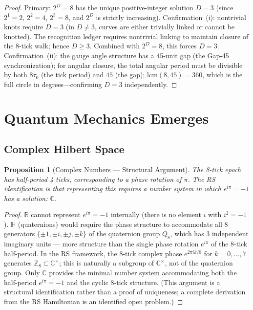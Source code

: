 \documentclass[12pt,a4paper]{article}
\newtheorem{proposition}[theorem]{Proposition}
\theoremstyle{definition}
\theoremstyle{remark}
\begin{document}
\begin{proof}
Primary: $2^D = 8$ has the unique positive-integer solution $D = 3$
(since $2^1 = 2$, $2^2 = 4$, $2^3 = 8$, and $2^D$ is strictly
increasing).
Confirmation~(i): nontrivial knots require $D = 3$ (in $D \neq 3$,
curves are either trivially linked or cannot be knotted).  The
recognition ledger requires nontrivial linking to maintain closure
of the 8-tick walk; hence $D \geq 3$.  Combined with $2^D = 8$,
this forces $D = 3$.
Confirmation~(ii): the gauge angle structure has a 45-unit gap (the
Gap-45 synchronization); for angular closure, the total angular
period must be divisible by both $8\tau_0$ (the tick period) and
$45$ (the gap); $\mathrm{lcm}(8, 45) = 360$, which is the full
circle in degrees---confirming $D = 3$ independently.
\end{proof}

\section{Quantum Mechanics Emerges}
\label{sec:QM}

\subsection{Complex Hilbert Space}

\begin{proposition}[Complex Numbers --- Structural Argument]
The 8-tick epoch has half-period 4 ticks, corresponding to a phase
rotation of $\pi$.  The RS identification is that representing this
requires a number system in which $e^{i\pi} = -1$ has a solution:
$\mathbb{C}$.
\end{proposition}

\begin{proof}
$\mathbb{R}$ cannot represent $e^{i\pi} = -1$ internally (there is
no element $i$ with $i^2 = -1$).  $\mathbb{H}$ (quaternions) would require the phase structure to accommodate
all 8 generators $\{\pm 1, \pm i, \pm j, \pm k\}$ of the quaternion group
$Q_8$, which has 3 independent imaginary units --- more structure than
the single phase rotation $e^{i\pi}$ of the 8-tick half-period.  In the
RS framework, the 8-tick complex phase $e^{2\pi i k/8}$ for $k = 0,\ldots,7$
generates $\mathbb{Z}_8 \subset \mathbb{C}^\times$; this is naturally a
subgroup of $\mathbb{C}^\times$, not of the quaternion group.  Only
$\mathbb{C}$ provides the minimal number system accommodating both the
half-period $e^{i\pi} = -1$ and the cyclic 8-tick structure.
(This argument is a structural identification rather than a proof of
uniqueness; a complete derivation from the RS Hamiltonian is an
identified open problem.)
\end{proof}
\end{document}
